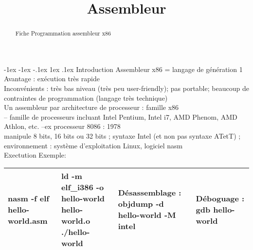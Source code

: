 \documentclass[5pt]{article}
\makeatletter
\renewcommand{\subsection}{\@startsection {section}{1}{\z@}%
             {-1ex \@plus -1ex \@minus -.1ex}%
             {1ex \@plus.1ex}%
             {\normalfont\small\sffamily\bfseries}}
\makeatother
\begin{document}
\begin{scriptsize}
\title{Assembleur}
\date{}
\begin{abstract}
Fiche Programmation assembleur x86 
\end{abstract}
\subsection{Introduction}
Assembleur x86  = langage de génération 1\\
Avantage : exécution très rapide \\
Inconvénients :
très bas niveau (très peu user-friendly); pas portable; beaucoup de contraintes de programmation (langage très technique)\\
Un assembleur par architecture de processeur : famille x86 \\
– famille de processeurs incluant Intel Pentium, Intel i7, AMD Phenom, AMD Athlon, etc. –ex processeur 8086 : 1978 \\
manipule 8 bits, 16 bits ou 32 bits ;
syntaxe Intel (et non pas syntaxe ATetT) ;
environnement : système d'exploitation Linux, logiciel nasm\\
Exectution Exemple:\\
\begin{tabularx}{\linewidth}{|Y|Y|Y|Y|}
\hline
nasm -f elf hello-world.asm &
ld -m elf\_i386 -o hello-world hello-world.o
./hello-world &
Désassemblage : objdump -d hello-world -M intel&
Déboguage : gdb hello-world 
\\ \hline
\end{tabularx}


\end{scriptsize}
\end{document}
